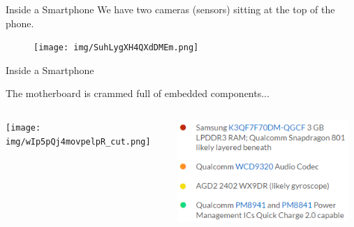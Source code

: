 \documentclass[aspectratio=169]{beamer}
\begin{document}
	\begin{frame}{Inside a Smartphone}
		We have two cameras (sensors) sitting at the top of the phone.
		\begin{figure}[b]		
		\centering
		\texttt{[image: img/SuhLygXH4QXdDMEm.png]}
		\end{figure}
	\end{frame}



	\begin{frame}{Inside a Smartphone}
		\begin{flushleft}The motherboard is crammed full of embedded components...\end{flushleft}
		\begin{columns}
		\begin{column}{0.55\textwidth}	
		\centering
		\texttt{[image: img/wIp5pQj4movpelpR\_cut.png]}	
		\end{column}
		\begin{column}{0.45\textwidth}
		\centering		
		\includegraphics[width=0.95\textwidth,height=0.75\textheight,keepaspectratio]{img/oneplus_1.png}
		\end{column}
		\end{columns}
	\end{frame}  
\end{document}

